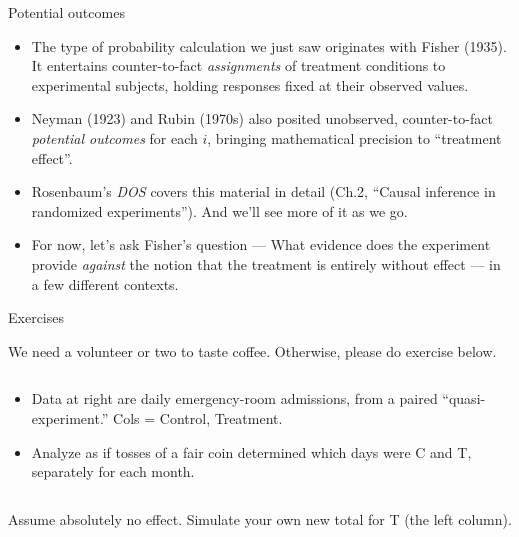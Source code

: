 \begin{frame}{Potential outcomes}
  
  \begin{itemize}[<+->]
  \item The type of probability calculation we just saw originates
    with Fisher (1935). It entertains counter-to-fact
    \textit{assignments} of treatment conditions to experimental
    subjects, holding responses fixed at their observed values.
  \item Neyman (1923) and Rubin (1970s) also posited
    unobserved, counter-to-fact \textit{potential outcomes} for each
    $i$, bringing mathematical precision to ``treatment effect''.
   \item Rosenbaum's \textit{DOS} covers this material in detail
       (Ch.2, ``Causal inference in randomized experiments''). And we'll
       see more of it as we go.
   \item For now, let's ask Fisher's question --- What evidence does
     the experiment provide \textit{against} the notion that the
     treatment is entirely without effect --- in a few different contexts.
  \end{itemize}

\end{frame}

\begin{frame}{Exercises}

 We need a volunteer or two to taste coffee. Otherwise, please do exercise
 below.
 
  \begin{columns}
    \begin{Column}
  \begin{itemize}
  \item Data at right are daily emergency-room admissions, from a paired
    ``quasi-experiment.'' Cols = Control, Treatment. 
  \item  Analyze as if tosses of a fair coin determined which days
    were C and T, separately for each month.
 \end{itemize}      
    \end{Column}
    \begin{Column}
    \end{Column}
  \end{columns}  

Assume absolutely no effect. Simulate your own new total for T (the
    left column).
   
\end{frame}
